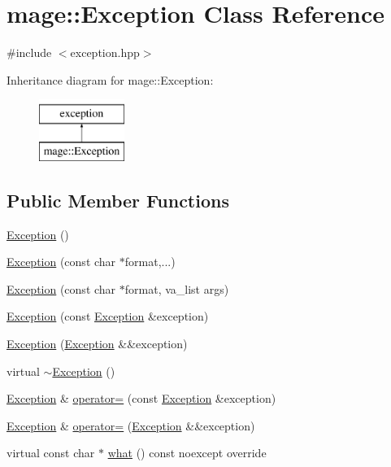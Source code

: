 \hypertarget{classmage_1_1_exception}{}\section{mage\+:\+:Exception Class Reference}
\label{classmage_1_1_exception}


{\ttfamily \#include $<$exception.\+hpp$>$}

Inheritance diagram for mage\+:\+:Exception\+:\begin{figure}[H]
\begin{center}
\leavevmode
\includegraphics[height=2.000000cm]{classmage_1_1_exception}
\end{center}
\end{figure}
\subsection*{Public Member Functions}
\begin{DoxyCompactItemize}
\item 
\hyperlink{classmage_1_1_exception_a87fd5f6c5465c01244020afbaebdb9f5}{Exception} ()
\item 
\hyperlink{classmage_1_1_exception_a140a96da55e56931ecd1f0e1adb69f00}{Exception} (const char $\ast$format,...)
\item 
\hyperlink{classmage_1_1_exception_a8296b7972fb8ca777399a5a640f2c40a}{Exception} (const char $\ast$format, va\+\_\+list args)
\item 
\hyperlink{classmage_1_1_exception_a3f8642ade2ed1168a9853a50ee0e8e98}{Exception} (const \hyperlink{classmage_1_1_exception}{Exception} \&exception)
\item 
\hyperlink{classmage_1_1_exception_a5a745eb8921cb986c822c0f95455314a}{Exception} (\hyperlink{classmage_1_1_exception}{Exception} \&\&exception)
\item 
virtual \hyperlink{classmage_1_1_exception_a088e91ba8dffd31a9d6aa7d4af2ee2c0}{$\sim$\+Exception} ()
\item 
\hyperlink{classmage_1_1_exception}{Exception} \& \hyperlink{classmage_1_1_exception_ab0e7e6b32b07505271a4a88067ab54f4}{operator=} (const \hyperlink{classmage_1_1_exception}{Exception} \&exception)
\item 
\hyperlink{classmage_1_1_exception}{Exception} \& \hyperlink{classmage_1_1_exception_aa9305c6bd8836f56ffa970473533f031}{operator=} (\hyperlink{classmage_1_1_exception}{Exception} \&\&exception)
\item 
virtual const char $\ast$ \hyperlink{classmage_1_1_exception_a2ec064e970c232b09c100e151195a3e4}{what} () const noexcept override
\end{DoxyCompactItemize}
